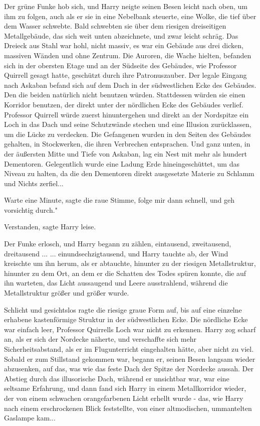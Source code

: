 Der grüne Funke hob sich, und Harry neigte seinen Besen leicht nach oben, um ihm
zu folgen, auch als er sie in eine Nebelbank steuerte, eine Wolke, die tief über
dem Wasser schwebte. Bald schwebten sie über dem riesigen dreiseitigen
Metallgebäude, das sich weit unten abzeichnete, und zwar leicht schräg. Das
Dreieck aus Stahl war hohl, nicht massiv, es war ein Gebäude aus drei dicken,
massiven Wänden und ohne Zentrum. Die Auroren, die Wache hielten, befanden sich
in der obersten Etage und an der Südseite des Gebäudes, wie Professor Quirrell
gesagt hatte, geschützt durch ihre Patronuszauber. Der legale Eingang nach
Askaban befand sich auf dem Dach in der südwestlichen Ecke des Gebäudes. Den die
beiden natürlich nicht benutzen würden. Stattdessen würden sie einen Korridor
benutzen, der direkt unter der nördlichen Ecke des Gebäudes verlief. Professor
Quirrell würde zuerst hinuntergehen und direkt an der Nordspitze ein Loch in das
Dach und seine Schutzwände stechen und eine Illusion zurücklassen, um die Lücke
zu verdecken. Die Gefangenen wurden in den Seiten des Gebäudes gehalten, in
Stockwerken, die ihren Verbrechen entsprachen. Und ganz unten, in der äußersten
Mitte und Tiefe von Askaban, lag ein Nest mit mehr als hundert Dementoren.
Gelegentlich wurde eine Ladung Erde hineingeschüttet, um das Niveau zu halten,
da die den Dementoren direkt ausgesetzte Materie zu Schlamm und Nichts
zerfiel...

\glqq{}Warte eine Minute\grqq{}, sagte die raue Stimme, \glqq{}folge mir dann
schnell, und geh vorsichtig durch."

\glqq{}Verstanden\grqq{}, sagte Harry leise.

Der Funke erlosch, und Harry begann zu zählen, eintausend, zweitausend,
dreitausend ... ... einundsechzigtausend, und Harry tauchte ab, der Wind
kreischte um ihn herum, als er abtauchte, hinunter zu der riesigen
Metallstruktur, hinunter zu dem Ort, an dem er die Schatten des Todes spüren
konnte, die auf ihn warteten, das Licht aussaugend und Leere ausstrahlend,
während die Metallstruktur größer und größer wurde.

Schlicht und gesichtslos ragte die riesige graue Form auf, bis auf eine einzelne
erhabene kastenförmige Struktur in der südwestlichen Ecke. Die nördliche Ecke
war einfach leer, Professor Quirrells Loch war nicht zu erkennen. Harry zog
scharf an, als er sich der Nordecke näherte, und verschaffte sich mehr
Sicherheitsabstand, als er im Flugunterricht eingehalten hätte, aber nicht zu
viel. Sobald er zum Stillstand gekommen war, begann er, seinen Besen langsam
wieder abzusenken, auf das, was wie das feste Dach der Spitze der Nordecke
aussah. Der Abstieg durch das illusorische Dach, während er unsichtbar war, war
eine seltsame Erfahrung, und dann fand sich Harry in einem Metallkorridor
wieder, der von einem schwachen orangefarbenen Licht erhellt wurde - das, wie
Harry nach einem erschrockenen Blick feststellte, von einer altmodischen,
ummantelten Gaslampe kam...

